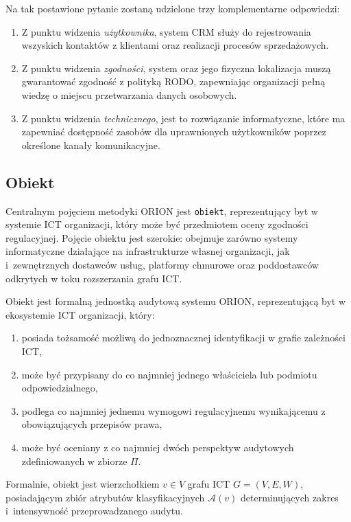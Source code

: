 Na tak postawione pytanie zostaną udzielone trzy komplementarne odpowiedzi:

\begin{enumerate}[label=(\roman*)]
    \item Z punktu widzenia \textit{użytkownika}, system CRM służy do rejestrowania wszyskich kontaktów z klientami oraz realizacji procesów sprzedażowych.
    \item Z punktu widzenia \textit{zgodności}, system oraz jego fizyczna lokalizacja muszą gwarantować zgodność z polityką RODO, zapewniając organizacji pełną wiedzę o miejscu przetwarzania danych osobowych.
    \item Z punktu widzenia \textit{technicznego}, jest to rozwiązanie informatyczne, które ma zapewniać dostępność zasobów dla uprawnionych użytkowników poprzez określone kanały komunikacyjne.
\end{enumerate}


\subsection{Obiekt}

Centralnym pojęciem metodyki ORION jest \texttt{obiekt}, reprezentujący  byt w systemie ICT organizacji, który może być przedmiotem  oceny zgodności regulacyjnej. Pojęcie obiektu jest szerokie: obejmuje zarówno systemy informatyczne działające 
na infrastrukturze własnej organizacji, jak i~zewnętrznych dostawców usług, platformy chmurowe oraz poddostawców odkrytych w toku rozszerzania grafu ICT.

\begin{definition}[Obiekt]
Obiekt jest formalną jednostką audytową systemu ORION, 
reprezentującą byt w ekosystemie ICT organizacji, który:
\begin{enumerate}[label=(\roman*)]
    \item posiada tożsamość możliwą do jednoznacznej identyfikacji w grafie zależności ICT,
    \item może być przypisany do co najmniej jednego właściciela  lub podmiotu odpowiedzialnego,
    \item podlega co najmniej jednemu wymogowi regulacyjnemu wynikającemu z obowiązujących przepisów prawa,
    \item może być oceniany z co najmniej dwóch perspektyw audytowych zdefiniowanych w zbiorze $\Pi$.
\end{enumerate}
Formalnie, obiekt jest wierzchołkiem $v \in V$ grafu ICT 
$G = (V, E, W)$, posiadającym zbiór atrybutów  klasyfikacyjnych $\mathcal{A}(v)$ determinujących zakres i~intensywność przeprowadzanego audytu.
\end{definition}


